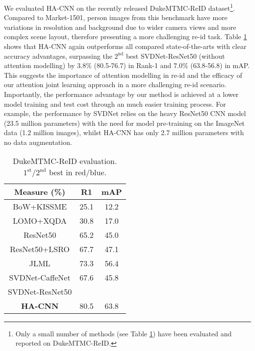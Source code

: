 \documentclass[10pt,twocolumn,letterpaper]{article}
\begin{document}
We evaluated HA-CNN on the recently released DukeMTMC-ReID dataset\footnote{Only a small number of methods (see Table \ref{tab:res_duke_reid}) 
	have been evaluated and reported on DukeMTMC-ReID.}.
Compared to Market-1501, person images from this benchmark 
have more variations in resolution and background due to 
wider camera views and more complex scene layout,
therefore presenting a more challenging re-id task.
Table \ref{tab:res_duke_reid} shows that HA-CNN again outperforms
all compared state-of-the-arts with clear accuracy advantages,
surpassing the $2^\text{nd}$ best SVDNet-ResNet50 (without attention modelling) 
by $3.8\%$ (80.5-76.7) in Rank-1 
and $7.0\%$ (63.8-56.8) in mAP.
This suggests the importance of attention modelling in re-id 
and the efficacy of our attention joint learning approach in a
more challenging re-id scenario. 
Importantly, the performance advantage by our method is achieved 
at a lower model training and test cost through an much easier training process.
For example, the performance by SVDNet relies on 
the heavy ResNet50 CNN model (23.5 million parameters) 
with the need for model pre-training on the ImageNet data (1.2 million
images), whilst HA-CNN has only 2.7 million parameters with no data augmentation.


\begin{table} \centering
\renewcommand{\arraystretch}{1}
	\setlength{\tabcolsep}{0.5cm}
\caption{DukeMTMC-ReID evaluation. $1^\text{st}/2^\text{nd}$ best in red/blue.
}
\begin{tabular}{|c|cc|}
		\hline
		Measure (\%)    & R1 & mAP   \\ \hline \hline
		BoW+KISSME \cite{wang2016highly} &  25.1 &  12.2 \\   LOMO+XQDA \cite{liao2015person} &  30.8 &  17.0  \\ \hline
ResNet50  \cite{he2016deep} &  65.2 &  45.0  \\ 
		ResNet50+LSRO \cite{zheng2017unlabeled}&  67.7 &  47.1  \\ 
		JLML \cite{li2017person} & 73.3 & 56.4   \\ 
		SVDNet-CaffeNet \cite{sun2017svdnet} & 67.6 & 45.8  \\
		SVDNet-ResNet50 \cite{sun2017svdnet} & \color{blue}{76.7} &   \color{blue}{56.8}  \\ 
		\hline
{\bf HA-CNN} &  \color{red} {80.5} &  \color{red} {63.8}  \\ 
		\hline
	\end{tabular}\label{tab:res_duke_reid}
	\vspace{-.3cm}
\end{table}
\end{document}
